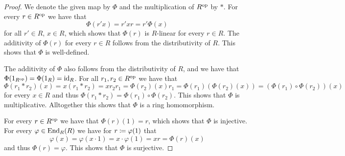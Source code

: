 \begin{proof}
  We denote the given map by $\Phi$ and the multiplication of $R^{\mathrm{op}}$ by $*$.
  For every $r \in R^{\mathrm{op}}$ we have that
  \[
      \Phi(r'x)
    = r' x r
    = r' \Phi(x)
  \]
  for all $r' \in R$, $x \in R$, which shows that $\Phi(r)$ is $R$-linear for every $r \in R$.
  The additivity of $\Phi(r)$ for every $r \in R$ follows from the distributivity of $R$.
  This shows that $\Phi$ is well-defined.
  
  The additivity of $\Phi$ also follows from the distributivity of $R$, and we have that $\Phi(1_{R^{\mathrm{op}}}) = \Phi(1_R) = \operatorname{id}_R$.
  For all $r_1, r_2 \in R^{\mathrm{op}}$ we have that
  \[
      \Phi(r_1 * r_2)(x)
    = x (r_1 * r_2)
    = x r_2 r_1
    = \Phi(r_2)(x) r_1
    = \Phi(r_1)(\Phi(r_2)(x))
    = (\Phi(r_1) \circ \Phi(r_2))(x)
  \]
  for every $x \in R$ and thus $\Phi(r_1 * r_2) = \Phi(r_1) \circ \Phi(r_2)$.
  This shows that $\Phi$ is multiplicative.
  Alltogether this shows that $\Phi$ is a ring homomorphism.
  
  For every $r \in R^{\mathrm{op}}$ we have that $\Phi(r)(1) = r$, which shows that $\Phi$ is injective.
  For every $\varphi \in \operatorname{End}_R(R)$ we have for $r \coloneqq \varphi(1)$ that
  \[
      \varphi(x)
    = \varphi(x \cdot 1)
    = x \cdot \varphi(1)
    = x r
    = \Phi(r)(x)
  \]
  and thus $\Phi(r) = \varphi$.
  This shows that $\Phi$ is surjective.
\end{proof}


